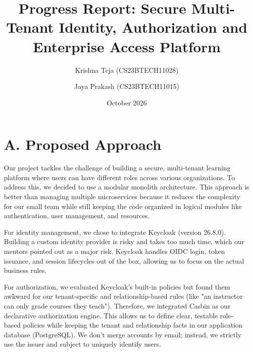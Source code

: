 \documentclass{article}
\title{Progress Report: Secure Multi-Tenant Identity, Authorization and Enterprise Access Platform}
\author{Krishna Teja (CS23BTECH11028) \and Jaya Prakash (CS23BTECH11015)}
\date{October 2026}
\begin{document}
\maketitle

\section*{A. Proposed Approach}
Our project tackles the challenge of building a secure, multi-tenant learning platform where users can have different roles across various organizations. To address this, we decided to use a modular monolith architecture. This approach is better than managing multiple microservices because it reduces the complexity for our small team while still keeping the code organized in logical modules like authentication, user management, and resources.

For identity management, we chose to integrate Keycloak (version 26.8.0). Building a custom identity provider is risky and takes too much time, which our mentors pointed out as a major risk. Keycloak handles OIDC login, token issuance, and session lifecycles out of the box, allowing us to focus on the actual business rules. 

For authorization, we evaluated Keycloak's built-in policies but found them awkward for our tenant-specific and relationship-based rules (like "an instructor can only grade courses they teach"). Therefore, we integrated Casbin as our declarative authorization engine. This allows us to define clear, testable role-based policies while keeping the tenant and relationship facts in our application database (PostgreSQL). We don't merge accounts by email; instead, we strictly use the issuer and subject to uniquely identify users.
\end{document}
